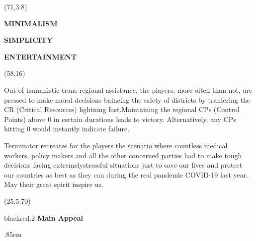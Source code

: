 \documentclass[hyperref={pdfpagelabels=false}]{beamer}
\begin{document}
\begin{frame}
\begin{textblock}{30}
\begin{blankbox}
		\end{blankbox}
	\end{textblock}

	\begin{textblock}{20}(71,3.8)
		\begin{blankbox}
			\Huge\textbf{MINIMALISM}

\vspace{0.4cm}

			\textbf{SIMPLICITY}
\vspace{0.4cm}

\textbf{ENTERTAINMENT}
		\end{blankbox}
	\end{textblock}
	\begin{textblock}{40}(58,16)
		\begin{blankbox}
\vspace {0.4cm}
Out of humanistic trans-regional assistance, the players, more often than not, are pressed to make moral decisions balncing the safety of districts by tranfering the CR (Critical Resources) lightning fast.Maintaining the regional CPs (Control Points) above 0 in certain durations leads to victory. Alternatively, any CPs hitting 0 would instantly indicate failure.\vspace {0.4cm}

 Terminator recreates for the players the scenario where countless medical workers, policy makers and all the other concerned parties had to make tough decisions facing extremelystressful situations just to save our lives and protect our countries as best as they can during the real pandemic COVID-19 last year. May their great spirit inspire us.\vspace {0.4cm}
			
		\end{blankbox}
	\end{textblock}





	
	\begin{textblock}{50}(25.5,70)
		\begin{transparentbox}{black}{red}{.2}
				\centering \vspace{.25cm}
				\huge\textbf{Main Appeal}\vspace{1cm}

\begin{itemize}\itemsep .85cm
\end{itemize}
\end{transparentbox}
\end{textblock}
\end{frame}
\end{document}
